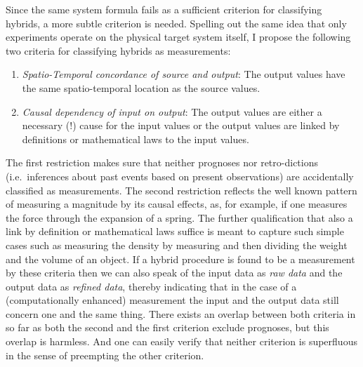 \documentclass[12pt, a4paper]{article}
\numberwithin{equation}{section}
\begin{document}
Since the same system formula fails as a sufficient criterion for classifying hybrids, a more subtle criterion is needed. Spelling out the same idea that only experiments operate on the physical target system itself, I propose the following two criteria for classifying hybrids as measurements: 

\begin{enumerate}

\item {\em Spatio-Temporal concordance of source and output}: The output values have the same spatio-temporal location as the source values.

\item {\em Causal dependency of input on output}: The output values are either a necessary (!) cause for the input values or the output values are linked by definitions or mathematical laws to the input values.

\end{enumerate}


The first restriction makes sure that neither prognoses
nor retro-dictions (i.e.\ inferences about past events based on present observations) are accidentally classified as measurements. The second restriction reflects the well known pattern of measuring a magnitude by its causal effects, as, for example, if one measures the force through the expansion of a spring. The further qualification that also a link by definition or mathematical laws suffice is meant to capture such simple cases such as measuring the density by measuring and then dividing the weight and the volume of an object. If a hybrid procedure is found to be a measurement by these criteria then we can also speak of the input data as \emph{raw data} and the output data as \emph{refined data}, thereby indicating that in the case of a (computationally enhanced) measurement the input and the output data still concern one and the same thing. There exists an overlap between both criteria in so far as both the second and the first criterion exclude prognoses, but this overlap is harmless. And one can easily verify that neither criterion is superfluous in the sense of preempting the other criterion.
\end{document}
